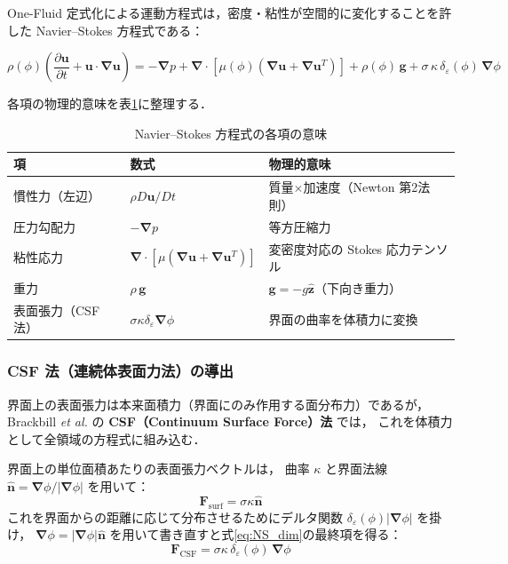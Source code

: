 \documentclass[12pt, a4paper, titlepage]{article}
\newcommand{\jp}[1]{{\normalfont\jpfont #1}}
\newcommand{\pd}[2]{\dfrac{\partial #1}{\partial #2}}
\newcommand{\bu}{\bm{u}}
\newcommand{\bg}{\bm{g}}
\newcommand{\bnabla}{\bm{\nabla}}
\newcommand{\de}{\delta_\varepsilon}
\begin{document}
\jp{One-Fluid 定式化による運動方程式は，密度・粘性が空間的に変化することを許した
Navier--Stokes 方程式である：}

\begin{tcolorbox}[mybox, title={\jp{One-Fluid Navier--Stokes 方程式（次元形）}}]
\begin{equation}
  \rho(\phi)\!\left(\pd{\bu}{t} + \bu\cdot\bnabla\bu\right)
  = -\bnabla p
  + \bnabla\cdot\!\left[\mu(\phi)\!\left(\bnabla\bu + \bnabla\bu^T\right)\right]
  + \rho(\phi)\,\bg
  + \sigma\,\kappa\,\de(\phi)\,\bnabla\phi
  \label{eq:NS_dim}
\end{equation}
\end{tcolorbox}

\jp{各項の物理的意味を表\ref{tab:NS_terms}に整理する．}

\begin{table}[h]
\centering
\caption{\jp{Navier--Stokes 方程式の各項の意味}}
\label{tab:NS_terms}
\begin{tabular}{@{}lll@{}}
\toprule
\jp{項} & \jp{数式} & \jp{物理的意味}\\
\midrule
\jp{慣性力（左辺）} & $\rho D\bu/Dt$ & \jp{質量}$\times$\jp{加速度（Newton 第2法則）}\\
\jp{圧力勾配力} & $-\bnabla p$ & \jp{等方圧縮力}\\
\jp{粘性応力} & $\bnabla\cdot[\mu(\bnabla\bu+\bnabla\bu^T)]$ & \jp{変密度対応の Stokes 応力テンソル}\\
\jp{重力} & $\rho\,\bg$ & \jp{$\bg = -g\hat{\bm{z}}$（下向き重力）}\\
\jp{表面張力（CSF法）} & $\sigma\kappa\de\bnabla\phi$ & \jp{界面の曲率を体積力に変換 \cite{Brackbill1992}}\\
\bottomrule
\end{tabular}
\end{table}

\subsubsection{CSF \jp{法（連続体表面力法）の導出}}

\jp{界面上の表面張力は本来面積力（界面にのみ作用する面分布力）であるが，
Brackbill \textit{et al.} \cite{Brackbill1992} の \textbf{CSF（Continuum Surface Force）法} では，
これを体積力として全領域の方程式に組み込む．}

\jp{界面上の単位面積あたりの表面張力ベクトルは，
曲率 $\kappa$ と界面法線 $\hat{\bm{n}} = \bnabla\phi/|\bnabla\phi|$ を用いて：}
\begin{equation}
  \bm{F}_{\mathrm{surf}} = \sigma\kappa\hat{\bm{n}}
\end{equation}
\jp{これを界面からの距離に応じて分布させるためにデルタ関数 $\de(\phi)|\bnabla\phi|$ を掛け，
$\bnabla\phi = |\bnabla\phi|\hat{\bm{n}}$ を用いて書き直すと式\eqref{eq:NS_dim}の最終項を得る：}
\begin{equation}
  \bm{F}_{\mathrm{CSF}} = \sigma\kappa\,\de(\phi)\,\bnabla\phi
\end{equation}
\end{document}
